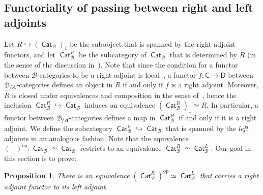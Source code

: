 \documentclass[reqno]{amsart}
\numberwithin{equation}{subsection}
\theoremstyle{plain}
\newtheorem{proposition}[equation]{Proposition}
\theoremstyle{definition}
\let\scr=\mathcal
\let\into=\hookrightarrow
\def\BB{\scr B}
\DeclareMathOperator{\ICat}{\mathsf{Cat}}
\newcommand{\op}{\mathrm{op}}
\newcommand{\Over}[2]{#1_{\hspace{-1pt}/#2}}
\newcommand{\I}[1]{\mathsf{#1}}
\begin{document}
\subsection{Functoriality of passing between right and left adjoints}
\label{sec:applicationFunctorialityAdjoints}
Let $R\into (\ICat_{\BB})_1$ be the subobject that is spanned by the right adjoint functors, and let $\ICat_{\BB}^R$ be the subcategory of $\ICat_{\BB}$ that is determined by $R$ (in the sense of the discussion in~\cite[\S~2.9]{Martini2021a}). Note that since the condition for a functor between $\BB$-categories to be a right adjoint is local~\cite[Remark~3.3.6]{Martini2021a}, a functor $f\colon\I{C}\to\I{D}$ between $\Over{\BB}{A}$-categories defines an object in $R$ if and only if $f$ is a right adjoint. Moreover, $R$ is closed under equivalences and composition in the sense of~\cite[Proposition~2.9.8]{Martini2021a}, hence the inclusion $\ICat_{\BB}^R\into\ICat_{\BB}$ induces an equivalence $(\ICat_{\BB}^R)_1\simeq R$. In particular, a functor between $\Over{\BB}{A}$-categories defines a map in $\ICat_{\BB}^R$ if and only if it is a right adjoint. We define the subcategory $\ICat_{\BB}^L\into\ICat_{\BB}$ that is spanned by the \emph{left} adjoints in an analogous fashion. Note that the equivalence $(-)^\op\colon \ICat_{\BB}\simeq\ICat_{\BB}$ restricts to an equivalence $\ICat_{\BB}^R\simeq\ICat_{\BB}^L$. Our goal in this section is to prove:
\begin{proposition}
	\label{prop:dualityRightLeftAdjoint}
	There is an equivalence $(\ICat_{\BB}^R)^\op\simeq\ICat_{\BB}^L$ that carries a right adjoint functor to its left adjoint.
\end{proposition}
\end{document}
